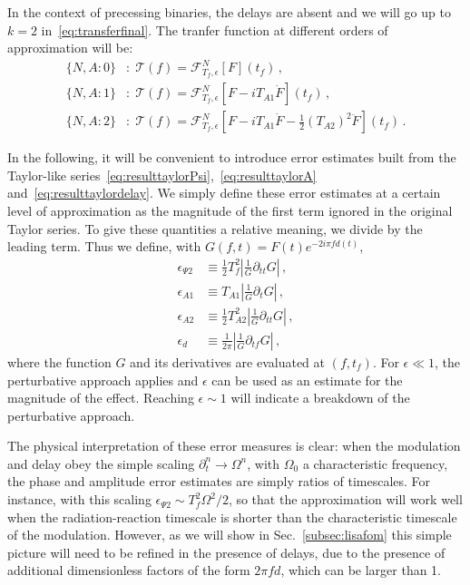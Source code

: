 \documentclass[aps,showpacs,twocolumn,
prd,superscriptaddress,nofootinbib]{revtex4-1}
\newcommand\calF{{\mathcal{F}}}
\newcommand\calT{{\mathcal{T}}}
\newcommand{\Tf}{T_{f}}
\begin{document}
In the context of precessing binaries, the delays are absent and we will go up to $k=2$ in~\eqref{eq:transferfinal}. The tranfer function at different orders of approximation will be:
\begin{subequations}\label{eq:summaryNA}
\begin{align}
	\{N,A:0\}&: \; \calT(f) = \calF^{N}_{\Tf, \epsilon} \left[ F \right] (t_{f}) \,, \\
	\{N,A:1\}&: \; \calT(f) = \calF^{N}_{\Tf, \epsilon} \left[ F - i T_{A1} \dot{F} \right] (t_{f}) \,, \\
	\{N,A:2\}&: \; \calT(f) = \calF^{N}_{\Tf, \epsilon} \left[ F - i T_{A1} \dot{F} - \frac{1}{2} (T_{A2})^{2} \ddot{F} \right] (t_{f}) \,.
\end{align}
\end{subequations}

In the following, it will be convenient to introduce error estimates built from the Taylor-like series~\eqref{eq:resulttaylorPsi},~\eqref{eq:resulttaylorA} and~\eqref{eq:resulttaylordelay}. We simply define these error estimates at a certain level of approximation as the magnitude of the first term ignored in the original Taylor series. To give these quantities a relative meaning, we divide by the leading term. Thus we define, with $G(f,t) = F(t) e^{-2i\pi f d(t)}$,
\begin{subequations}\label{eq:deffom}
\begin{align}
	\epsilon_{\Psi 2} &\equiv \frac{1}{2} \Tf^{2} \left| \frac{1}{G}\partial_{tt}G \right| \,, \\
	\epsilon_{A 1} &\equiv T_{A1} \left| \frac{1}{G} \partial_{t} G \right| \,, \\
	\epsilon_{A 2} &\equiv \frac{1}{2} T_{A2}^{2} \left| \frac{1}{G} \partial_{tt}G \right| \,, \\
	\epsilon_{d} &\equiv \frac{1}{2\pi} \left| \frac{1}{G} \partial_{tf} G \right| \,,
\end{align}
\end{subequations}
where the function $G$ and its derivatives are evaluated at $(f, t_{f})$. For $\epsilon \ll 1$, the perturbative approach applies and $\epsilon$ can be used as an estimate for the magnitude of the effect. Reaching $\epsilon \sim 1$ will indicate a breakdown of the perturbative approach.

The physical interpretation of these error measures is clear: when the modulation and delay obey the simple scaling $\partial_{t}^{n} \rightarrow \Omega^{n}$, with $\Omega_{0}$ a characteristic frequency, the phase and amplitude error estimates are simply ratios of timescales. For instance, with this scaling $\epsilon_{\Psi 2} \sim T_{f}^{2}\Omega^{2}/2$, so that the approximation will work well when the radiation-reaction timescale is shorter than the characteristic timescale of the modulation. However, as we will show in Sec.~\ref{subsec:lisafom} this simple picture will need to be refined in the presence of delays, due to the presence of additional dimensionless factors of the form $2\pi f d$, which can be larger than 1.
\end{document}
